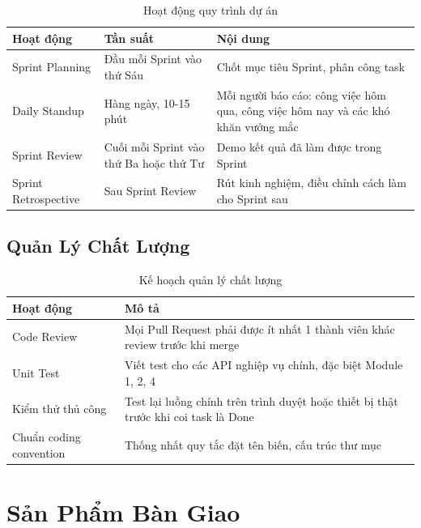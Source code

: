 \begin{table}[H]
  \centering
  \begin{tabularx}{\textwidth}{|>{\raggedright\arraybackslash}X|l|>{\raggedright\arraybackslash}X|}
    \hline
    \textbf{Hoạt động} & \textbf{Tần suất} & \textbf{Nội dung} \\
    \hline
    Sprint Planning & Đầu mỗi Sprint vào thứ Sáu & Chốt mục tiêu Sprint, phân công task \\ \hline
    Daily Standup & Hàng ngày, 10-15 phút & Mỗi người báo cáo: công việc hôm qua, công việc hôm nay và các khó khăn vướng mắc \\ \hline
    Sprint Review & Cuối mỗi Sprint vào thứ Ba hoặc thứ Tư & Demo kết quả đã làm được trong Sprint \\ \hline
    Sprint Retrospective & Sau Sprint Review & Rút kinh nghiệm, điều chỉnh cách làm cho Sprint sau \\
    \hline
  \end{tabularx}
  \caption{Hoạt động quy trình dự án}
  \label{tab:process_activities}
\end{table}

\subsection{Quản Lý Chất Lượng}

\begin{table}[H]
  \centering
  \begin{tabularx}{\textwidth}{|l|X|}
    \hline
    \textbf{Hoạt động} & \textbf{Mô tả} \\
    \hline
    Code Review & Mọi Pull Request phải được ít nhất 1 thành viên khác review trước khi merge \\ \hline
    Unit Test & Viết test cho các API nghiệp vụ chính, đặc biệt Module 1, 2, 4 \\ \hline
    Kiểm thử thủ công & Test lại luồng chính trên trình duyệt hoặc thiết bị thật trước khi coi task là Done \\ \hline
    Chuẩn coding convention & Thống nhất quy tắc đặt tên biến, cấu trúc thư mục\\
    \hline
  \end{tabularx}
  \caption{Kế hoạch quản lý chất lượng}
  \label{tab:quality_management}
\end{table}

\section{Sản Phẩm Bàn Giao}


